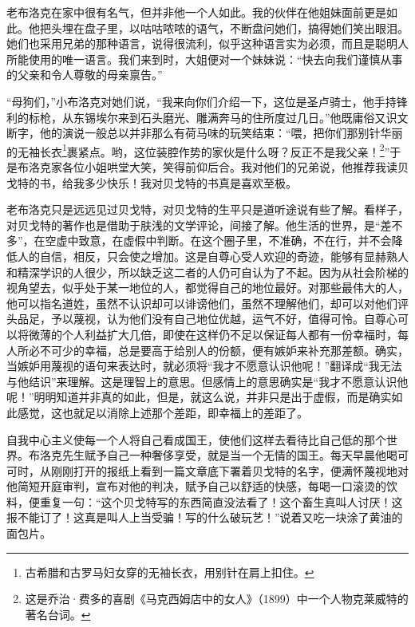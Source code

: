 \par 老布洛克在家中很有名气，但并非他一个人如此。我的伙伴在他姐妹面前更是如此。他把头埋在盘子里，以咕咕哝哝的语气，不断盘问她们，搞得她们笑出眼泪。她们也采用兄弟的那种语言，说得很流利，似乎这种语言实为必须，而且是聪明人所能使用的唯一语言。我们来到时，大姐便对一个妹妹说：“快去向我们谨慎从事的父亲和令人尊敬的母亲禀告。”
\par “母狗们，”小布洛克对她们说，“我来向你们介绍一下，这位是圣卢骑士，他手持锋利的标枪，从东锡埃尔来到石头磨光、雕满奔马的住所度过几日。”他既庸俗又识文断字，他的演说一般总以并非那么有荷马味的玩笑结束：“喂，把你们那别针华丽的无袖长衣\footnote{古希腊和古罗马妇女穿的无袖长衣，用别针在肩上扣住。}裹紧点。哟，这位装腔作势的家伙是什么呀？反正不是我父亲！\footnote{这是乔治·费多的喜剧《马克西姆店中的女人》（1899）中一个人物克莱威特的著名台词。}”于是布洛克家各位小姐哄堂大笑，笑得前仰后合。我对他们的兄弟说，他推荐我读贝戈特的书，给我多少快乐！我对贝戈特的书真是喜欢至极。
\par 老布洛克只是远远见过贝戈特，对贝戈特的生平只是道听途说有些了解。看样子，对贝戈特的著作也是借助于肤浅的文学评论，间接了解。他生活的世界，是“差不多”，在空虚中致意，在虚假中判断。在这个圈子里，不准确，不在行，并不会降低人的自信，相反，只会使之增加。这是自尊心受人欢迎的奇迹，能够有显赫熟人和精深学识的人很少，所以缺乏这二者的人仍可自认为了不起。因为从社会阶梯的视角望去，似乎处于某一地位的人，都觉得自己的地位最好。对那些最伟大的人，他可以指名道姓，虽然不认识却可以诽谤他们，虽然不理解他们，却可以对他们评头品足，予以蔑视，认为他们没有自己地位优越，运气不好，值得可怜。自尊心可以将微薄的个人利益扩大几倍，即使在这样仍不足以保证每人都有一份幸福时，每人所必不可少的幸福，总是要高于给别人的份额，便有嫉妒来补充那差额。确实，当嫉妒用蔑视的语句来表达时，就必须将“我才不愿意认识他呢！”翻译成“我无法与他结识”来理解。这是理智上的意思。但感情上的意思确实是“我才不愿意认识他呢！”明明知道并非真的如此，但是，就这么说，并非只是出于虚假，而是确实如此感觉，这也就足以消除上述那个差距，即幸福上的差距了。
\par 自我中心主义使每一个人将自己看成国王，使他们这样去看待比自己低的那个世界。布洛克先生赋予自己一种奢侈享受，就是当一个无情的国王。每天早晨他喝可可时，从刚刚打开的报纸上看到一篇文章底下署着贝戈特的名字，便满怀蔑视地对他简短开庭审判，宣布对他的判决，赋予自己以舒适的快感，每喝一口滚烫的饮料，便重复一句：“这个贝戈特写的东西简直没法看了！这个畜生真叫人讨厌！这报不能订了！这真是叫人上当受骗！写的什么破玩艺！”说着又吃一块涂了黄油的面包片。
